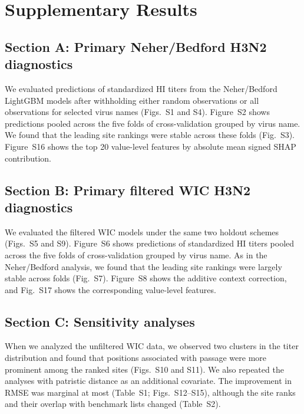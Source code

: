 \documentclass[12pt]{article}
\newenvironment{fitsupplementtable}{%
  \begingroup
  \renewenvironment{tabular*}[2]{%
    \begin{lrbox}{\supplementtablebox}\begin{tabular}{##2}%
  }{%
    \end{tabular}\end{lrbox}%
    \ifdim\wd\supplementtablebox>\textwidth
      \resizebox{\textwidth}{!}{\usebox{\supplementtablebox}}%
    \else\usebox{\supplementtablebox}\fi
  }%
}{\endgroup}
\begin{document}
\setcounter{table}{5}
\begin{fitsupplementtable}

\end{fitsupplementtable}

\clearpage

\section*{Supplementary Results}

\subsection*{Section A: Primary Neher/Bedford H3N2 diagnostics}

We evaluated predictions of standardized HI titers from the Neher/Bedford LightGBM models after withholding either random observations or all observations for selected virus names (Figs.~S1 and S4). Figure~S2 shows predictions pooled across the five folds of cross-validation grouped by virus name. We found that the leading site rankings were stable across these folds (Fig.~S3). Figure~S16 shows the top 20 value-level features by absolute mean signed SHAP contribution.

\subsection*{Section B: Primary filtered WIC H3N2 diagnostics}

We evaluated the filtered WIC models under the same two holdout schemes (Figs.~S5 and S9). Figure~S6 shows predictions of standardized HI titers pooled across the five folds of cross-validation grouped by virus name. As in the Neher/Bedford analysis, we found that the leading site rankings were largely stable across folds (Fig.~S7). Figure~S8 shows the additive context correction, and Fig.~S17 shows the corresponding value-level features.

\subsection*{Section C: Sensitivity analyses}

When we analyzed the unfiltered WIC data, we observed two clusters in the titer distribution and found that positions associated with passage were more prominent among the ranked sites (Figs.~S10 and S11). We also repeated the analyses with patristic distance as an additional covariate. The improvement in RMSE was marginal at most (Table~S1; Figs.~S12--S15), although the site ranks and their overlap with benchmark lists changed (Table~S2).
\end{document}
